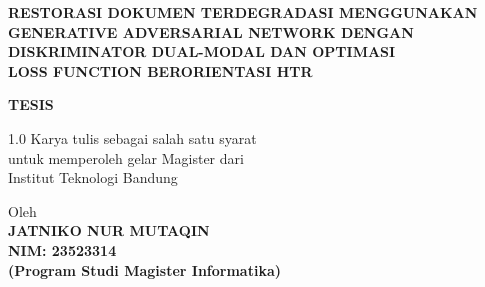 

% 

\begin{titlepage}
    \centering %
    
    \vspace*{0.5cm} %
    \begingroup
        \fontsize{14pt}{14pt}\selectfont %
        \bfseries %
        \MakeUppercase{Restorasi Dokumen Terdegradasi Menggunakan \\ Generative Adversarial Network dengan \\
        Diskriminator Dual-Modal dan Optimasi \\ Loss Function Berorientasi HTR}
    \endgroup

    \vspace{3cm} %

    {\large \textbf{TESIS}}

    \vspace{0.5cm}

    \begin{spacing}{1.0}
        Karya tulis sebagai salah satu syarat\\
        untuk memperoleh gelar Magister dari\\
        Institut Teknologi Bandung
    \end{spacing}

    \vspace{2cm} %

    Oleh\\
    \vspace{0.2cm}
    \textbf{\MakeUppercase{JATNIKO NUR MUTAQIN}}\\
    \textbf{NIM: 23523314}\\
    \textbf{(Program Studi Magister Informatika)}


\end{titlepage}
